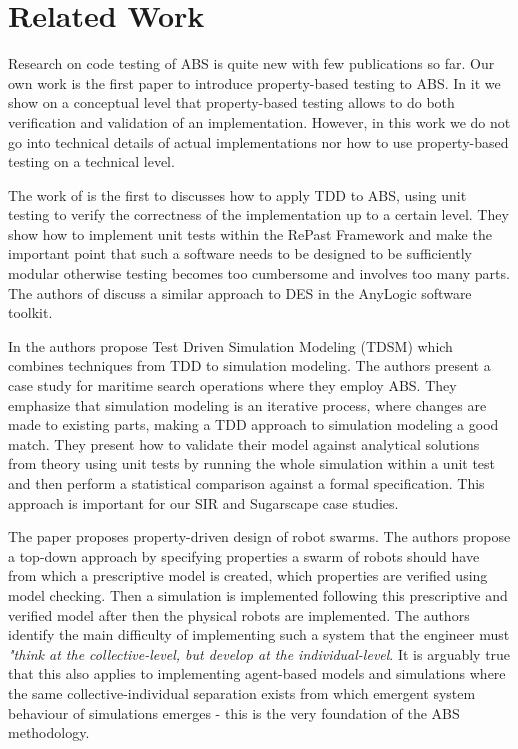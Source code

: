 \section{Related Work}
\label{sec:related}

Research on code testing of ABS is quite new with few publications so far. Our own work \cite{thaler_show_2019} is the first paper to introduce property-based testing to ABS. In it we show on a conceptual level that property-based testing allows to do both verification and validation of an implementation. However, in this work we do not go into technical details of actual implementations nor how to use property-based testing on a technical level.

The work of \cite{collier_test-driven_2013} is the first to discusses how to apply TDD to ABS, using unit testing \cite{beck_test_2002} to verify the correctness of the implementation up to a certain level. They show how to implement unit tests within the RePast Framework  and make the important point that such a software needs to be designed to be sufficiently modular otherwise testing becomes too cumbersome and involves too many parts. The authors of \cite{asta_investigation_2014} discuss a similar approach to DES in the AnyLogic software toolkit. 

In \cite{onggo_test-driven_2016} the authors propose Test Driven Simulation Modeling (TDSM) which combines techniques from TDD to simulation modeling. The authors present a case study for maritime search operations where they employ ABS. They emphasize that simulation modeling is an iterative process, where changes are made to existing parts, making a TDD approach to simulation modeling a good match. They present how to validate their model against analytical solutions from theory using unit tests by running the whole simulation within a unit test and then perform a statistical comparison against a formal specification. This approach is important for our SIR and Sugarscape case studies.

The paper \cite{brambilla_property-driven_2012} proposes property-driven design of robot swarms. The authors propose a top-down approach by specifying properties a swarm of robots should have from which a prescriptive model is created, which properties are verified using model checking. Then a simulation is implemented following this prescriptive and verified model after then the physical robots are implemented. The authors identify the main difficulty of implementing such a system that the engineer must \textit{"think at the collective-level, but develop at the individual-level}. It is arguably true that this also applies to implementing agent-based models and simulations where the same collective-individual separation exists from which emergent system behaviour of simulations emerges - this is the very foundation of the ABS methodology.

